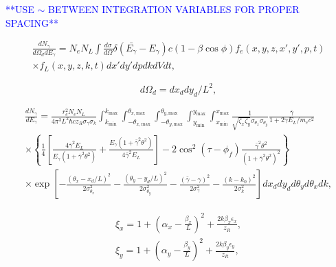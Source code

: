 \documentclass[../main.tex]{subfiles}
\begin{document}
\textcolor{blue}{**USE $\sim$ BETWEEN INTEGRATION VARIABLES FOR PROPER SPACING**}

\begin{multline}
\frac{dN_{\gamma}}{d\Omega_{d} dE_{\gamma}} = N_{e}N_{L}\int \frac{d\sigma}{d\Omega}\delta\left(\bar{E_{\gamma}}-E_{\gamma}\right)c\left(1-\beta\cos\phi\right)f_{e}\left(x,y,z,x',y',p,t\right)\\ \times f_L\left(x,y,z,k,t\right)dx' dy' dp dk dV dt,
\label{eq:central_distribution_sun}
\end{multline}

\begin{equation}
d\Omega_{d} = dx_{d}dy_{d}/L^{2},
\label{eq:detector_solid_angle_sun}
\end{equation}

\begin{multline}
\frac{dN_{\gamma}}{dE_{\gamma}} = \frac{r_{e}^{2}N_{e}N_{L}}{4\pi^{3}L^{2}\hbar c z_{R}\sigma_{\gamma}\sigma_{k}}\int_{k_{\mathrm{min}}}^{k_{\mathrm{max}}}\int_{-\theta_{x,\mathrm{max}}}^{\theta_{x,\mathrm{max}}}\int_{-\theta_{y,\mathrm{max}}}^{\theta_{y,\mathrm{max}}}\int_{y_{\mathrm{min}}}^{y_{\mathrm{max}}}\int_{x_{\mathrm{min}}}^{x_{\mathrm{max}}}\frac{1}{\sqrt{\zeta_{x}\zeta_{y}}\sigma_{\theta_{x}}\sigma_{\theta_{y}}}\frac{\bar{\gamma}}{1+2\gamma E_{L}/m_{e}c^{2}} \\
\times\left\{\frac{1}{4}\left[\frac{4\bar{\gamma}^{2}E_{L}}{E_{\gamma}\left(1+\bar{\gamma}^{2}\theta^{2}\right)}+\frac{E_{\gamma}\left(1+\bar{\gamma}^{2}\theta^{2}\right)}{4\bar{\gamma}^{2}E_{L}}\right]-2\cos^{2}\left(\tau-\phi_{f}\right)\frac{\bar{\gamma}^{2}\theta^{2}}{\left(1+\bar{\gamma}^{2}\theta^{2}\right)^{2}}\right\} \\
\times\exp{\left[-\frac{\left(\theta_{x}-x_{d}/L\right)^{2}}{2\sigma_{\theta_{x}}^{2}}-\frac{\left(\theta_{y}-y_{d}/L\right)^{2}}{2\sigma_{\theta_{y}}^{2}}-\frac{\left(\bar{\gamma}-\gamma\right)^{2}}{2\sigma_{\gamma}^{2}}-\frac{\left(k-k_{0}\right)^{2}}{2\sigma_{k}^{2}}\right]}dx_{d}dy_{d}d\theta_{y}d\theta_{x}dk,
\label{eq:ICARUS_equation}
\end{multline}

\begin{gather}
\xi_{x} = 1+\left(\alpha_{x}-\frac{\beta_{x}}{L}\right)^{2}+\frac{2k\beta_{x}\epsilon_{x}}{z_{R}}, \\
\xi_{y} = 1+\left(\alpha_{y}-\frac{\beta_{y}}{L}\right)^{2}+\frac{2k\beta_{y}\epsilon_{y}}{z_{R}},
\label{eq:xi_parameters_sun}
\end{gather}
\end{document}
